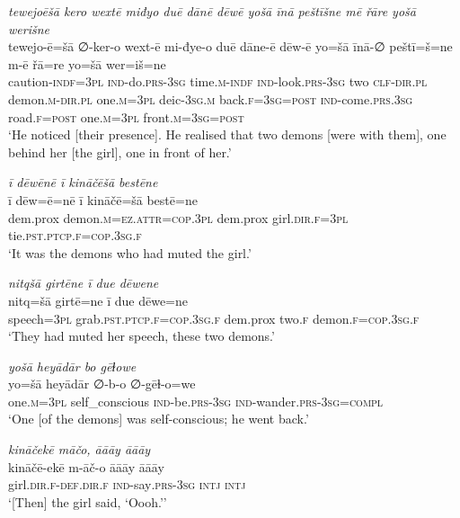 \ea \label{ŽP.176}
\textit{tewejoēšā kero wextē miđyo duē dānē dēwē yošā īnā peštīšne mē řāre yošā werišne} \\ 
\gll tewejo-ē=šā ∅-ker-o wext-ē mi-đye-o duē dāne-ē dēw-ē yo=šā īnā-∅ peštī=š=ne m-ē řā=re yo=šā wer=iš=ne \\ 
 caution\textsc{-indf}\textsc{=3pl} \textsc{ind-}do\textsc{.prs}\textsc{-3sg} time\textsc{.m}\textsc{-indf} \textsc{ind-}look\textsc{.prs}\textsc{-3sg} two \textsc{clf}\textsc{-dir}\textsc{.pl} demon\textsc{.m}\textsc{-dir}\textsc{.pl} one\textsc{.m}\textsc{=3pl} deic\textsc{-3sg}\textsc{.m} back\textsc{.f}\textsc{=3sg}\textsc{=\textsc{post}} \textsc{ind-}come\textsc{.prs}\textsc{.3sg} road\textsc{.f}\textsc{=\textsc{post}} one\textsc{.m}\textsc{=3pl} front\textsc{.m}\textsc{=3sg}\textsc{=\textsc{post}} \\ 
\glt `He noticed [their presence]. He realised that two demons [were with them], one behind her [the girl], one in front of her.'
\z 
 
\ea \label{ŽP.177}
\textit{ī dēwēnē ī kināčēšā bestēne} \\ 
\gll ī dēw=ē=nē ī kināčē=šā bestē=ne \\ 
 dem.prox demon\textsc{.m}\textsc{=ez}.\textsc{attr}\textsc{=cop}\textsc{.3pl} dem.prox girl\textsc{.dir}\textsc{.f}\textsc{=3pl} tie\textsc{.pst}\textsc{.ptcp}\textsc{.f}\textsc{=cop}\textsc{.3sg}\textsc{.f} \\ 
\glt `It was the demons who had muted the girl.'
\z 
 
\ea \label{ŽP.178}
\textit{nitqšā girtēne ī due dēwene} \\ 
\gll nitq=šā girtē=ne ī due dēwe=ne \\ 
 speech\textsc{=3pl} grab\textsc{.pst}\textsc{.ptcp}\textsc{.f}\textsc{=cop}\textsc{.3sg}\textsc{.f} dem.prox two\textsc{.f} demon\textsc{.f}\textsc{=cop}\textsc{.3sg}\textsc{.f} \\ 
\glt `They had muted her speech, these two demons.'
\z 
 
\ea \label{ŽP.180}
\textit{yošā heyādār bo gēɫowe} \\ 
\gll yo=šā heyādār ∅-b-o ∅-gēɫ-o=we \\ 
 one\textsc{.m}\textsc{=3pl} self\_conscious \textsc{ind-}be\textsc{.prs}\textsc{-3sg} \textsc{ind-}wander\textsc{.prs}\textsc{-3sg}\textsc{=compl} \\ 
\glt `One [of the demons] was self-conscious; he went back.'
\z 
 
\ea \label{ŽP.181}
\textit{kināčekē māčo, āāāy āāāy} \\ 
\gll kināčē-ekē m-āč-o āāāy āāāy \\ 
 girl\textsc{.dir}\textsc{.f}\textsc{-def}\textsc{.dir}\textsc{.f} \textsc{ind-}say\textsc{.prs}\textsc{-3sg} \textsc{intj} \textsc{intj} \\ 
\glt `[Then] the girl said, ‘Oooh.’'
\z 
 
